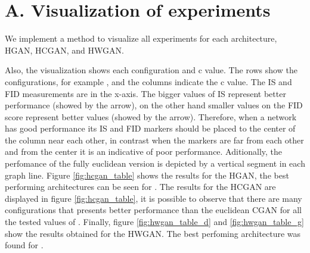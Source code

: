 \documentclass[journal]{IEEEtran}
\begin{document}
\begin{comment}


\begin{figure*}[t]
    \centering
    \texttt{[image: images/losses\_hgan\_smooth\_0.85.pdf]}
    \caption{\textcolor{red}{Imagenes de los loss, estan suavizadas con 0.85. No son imagenes definitivas pero creo que pueden ser de utilidad para ilustrar la no linealidad de las capas hiperbolicas y tambien se pueden suavizar mas aun}}
    \label{fig:my_label}
\end{figure*}

\begin{figure*}[t]
    \centering
    \texttt{[image: images/losses\_hcgan\_smooth\_0.85.pdf]}
    \caption{Caption}
    \label{fig:my_label}
\end{figure*}

\begin{figure*}[t]
    \centering
    \texttt{[image: images/losses\_hwgan\_smooth\_0.85.pdf]}
    \caption{Caption}
    \label{fig:my_label}
\end{figure*}
\end{comment}






\section*{A. Visualization of experiments }


We implement a method to visualize all experiments for each architecture, HGAN, HCGAN, and HWGAN.\newpage

Also, the visualization shows each configuration and c value. The rows show the configurations, for example , and the columns indicate the c value. The IS and FID measurements are in the x-axis. The bigger values of IS represent better performance (showed by the  arrow), on the other hand smaller values on the FID score represent better values (showed by the  arrow). Therefore, when a network has good performance its IS and FID markers should be placed to the center of the column near each other, in contrast when the markers are far from each other and from the center it is an indicative of poor performance. Aditionally, the perfomance of the fully euclidean version is depicted by a vertical segment in each graph line. Figure \ref{fig:hcgan_table} shows the results for the HGAN, the best performing architectures can be seen for . The results for the HCGAN are displayed in figure \ref{fig:hcgan_table}, it is possible to observe that there are many configurations that presents better performance than the euclidean CGAN for all the tested values of . Finally, figure \ref{fig:hwgan_table_d} and \ref{fig:hwgan_table_g} show the results obtained for the HWGAN. The best perfoming architecture was found for .
\end{document}

